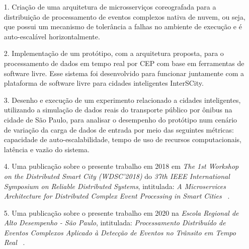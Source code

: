 \begin{itemize}
  \item[1.] Criação de uma arquitetura de microsserviços coreografada para a distribuição de processamento de eventos complexos nativa de nuvem, ou seja, que possui um mecanismo de tolerância a falhas no ambiente de execução e é auto-escalável horizontalmente. %

  
  \item[2.] Implementação de um protótipo, com a arquitetura proposta, para o processamento de dados em tempo real por CEP com base em ferramentas de software livre. Esse sistema foi desenvolvido para funcionar juntamente com a plataforma de software livre para cidades inteligentes InterSCity. %
  
  
  \item[3.] Desenho e execução de um experimento relacionado a cidades inteligentes, utilizando a simulação de dados reais do transporte público por ônibus na cidade de São Paulo, para analisar o desempenho do protótipo num cenário de variação da carga de dados de entrada por meio das seguintes métricas: capacidade de auto-escalabilidade, tempo de uso de recursos computacionais, latência e vazão do sistema.%
  
  \item[4.] Uma publicação sobre o presente trabalho em 2018 em \textit{The 1st Workshop on the Distributed Smart City (WDSC'2018)} do \textit{37th IEEE International Symposium on Reliable Distributed Systems}, intitulada: \textit{A Microservices Architecture for Distributed Complex Event Processing in Smart Cities} ~\citep{8615650}.
  
  \item[5.] Uma publicação sobre o presente trabalho em 2020 na \textit{Escola Regional de Alto Desempenho - São Paulo}, intitulada: \textit{Processamento Distribuído de Eventos Complexos Aplicado à Detecção de Eventos no Trânsito em Tempo Real} ~\citep{scattone2020cep}. 


\end{itemize}

